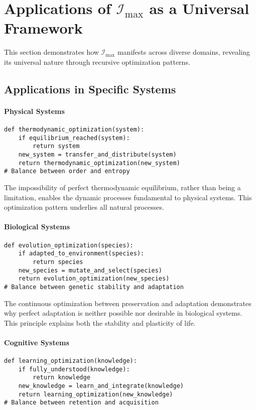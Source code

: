 \documentclass[12pt]{article}
\begin{document}
\section{Applications of $\mathcal{I}_{\text{max}}$ as a Universal Framework}

This section demonstrates how $\mathcal{I}_{\text{max}}$ manifests across diverse domains, revealing its universal nature through recursive optimization patterns.

\subsection{Applications in Specific Systems}

\paragraph{Physical Systems}
\begin{verbatim}
def thermodynamic_optimization(system):
    if equilibrium_reached(system):
        return system
    new_system = transfer_and_distribute(system)
    return thermodynamic_optimization(new_system)
# Balance between order and entropy
\end{verbatim}

The impossibility of perfect thermodynamic equilibrium, rather than being a limitation, enables the dynamic processes fundamental to physical systems. This optimization pattern underlies all natural processes.

\paragraph{Biological Systems}
\begin{verbatim}
def evolution_optimization(species):
    if adapted_to_environment(species):
        return species
    new_species = mutate_and_select(species)
    return evolution_optimization(new_species)
# Balance between genetic stability and adaptation
\end{verbatim}

The continuous optimization between preservation and adaptation demonstrates why perfect adaptation is neither possible nor desirable in biological systems. This principle explains both the stability and plasticity of life.

\paragraph{Cognitive Systems}
\begin{verbatim}
def learning_optimization(knowledge):
    if fully_understood(knowledge):
        return knowledge
    new_knowledge = learn_and_integrate(knowledge)
    return learning_optimization(new_knowledge)
# Balance between retention and acquisition
\end{verbatim}
\end{document}

